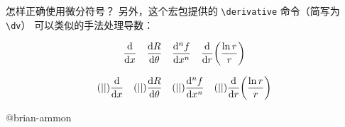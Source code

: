 \begin{myQA}{怎样正确使用微分符号？}
	另外，这个宏包提供的 \verb|\derivative| 命令（简写为 \verb|\dv|）
	可以类似的手法处理导数：
\begin{myExampleH}
{
\begin{equation*}
\dv{x} \quad \dv{R}{\theta} \quad \dv[n]{f}{x} \quad
\dv{r}(\frac{\ln r}{r})
\end{equation*}
}
\usepackage{physics}
\begin{equation*}
(|{ {} {} {} }|)\dv{x} \quad
(|{ {} {} {} }|)\dv{R}{\theta} \quad
(|{ {} {} {} }|)\dv[n]{f}{x} \quad
(|{ {} {} {} }|)\dv{r}(\frac{\ln r}{r})
\end{equation*}
\end{myExampleH}
	
	@brian-ammon
	
\end{myQA}
